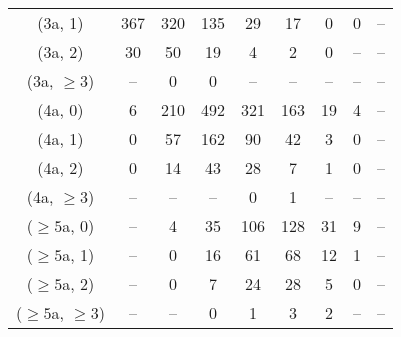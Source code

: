 \begin{table}[h!]
{\begin{tabular}{ccccccccc}
	(3a, 1) & 367 & 320 & 135 & 29 & 17 & 0 & 0 & -- \\[0.5ex] 
	(3a, 2) & 30 & 50 & 19 & 4 & 2 & 0 & -- & -- \\[0.5ex] 
	(3a, $\ge3$) & -- & 0 & 0 & -- & -- & -- & -- & -- \\[0.5ex] 
	(4a, 0) & 6 & 210 & 492 & 321 & 163 & 19 & 4 & -- \\[0.5ex] 
	(4a, 1) & 0 & 57 & 162 & 90 & 42 & 3 & 0 & -- \\[0.5ex] 
	(4a, 2) & 0 & 14 & 43 & 28 & 7 & 1 & 0 & -- \\[0.5ex] 
	(4a, $\ge3$) & -- & -- & -- & 0 & 1 & -- & -- & -- \\[0.5ex] 
	($\ge5$a, 0) & -- & 4 & 35 & 106 & 128 & 31 & 9 & -- \\[0.5ex] 
	($\ge5$a, 1) & -- & 0 & 16 & 61 & 68 & 12 & 1 & -- \\[0.5ex] 
	($\ge5$a, 2) & -- & 0 & 7 & 24 & 28 & 5 & 0 & -- \\[0.5ex] 
	($\ge5$a, $\ge3$) & -- & -- & 0 & 1 & 3 & 2 & -- & -- \\[0.5ex] 
	\hline
	\hline
\end{tabular}}
\end{table}
